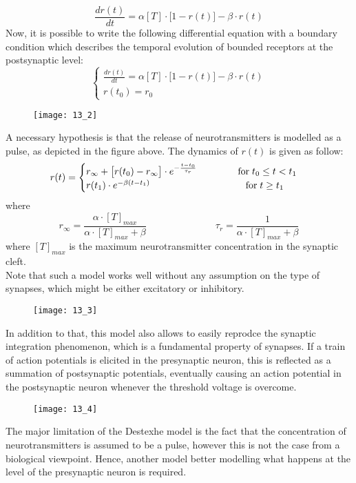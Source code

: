\begin{equation*}
    \frac{dr(t)}{dt}=\alpha[T]\cdot\bigl[1-r(t)\bigr]-\beta\cdot{r(t)}
\end{equation*}
Now, it is possible to write the following differential equation with a boundary
condition which describes the temporal evolution of bounded receptors at the postsynaptic level:
\begin{equation*}
    \begin{cases}
        \frac{dr(t)}{dt}=\alpha[T]\cdot\bigl[1-r(t)\bigr]-\beta\cdot{r(t)} \\
        r(t_{0})=r_{0}
    \end{cases}
\end{equation*}
\begin{figure}[H]
    \texttt{[image: 13\_2]}
    \centering
\end{figure}
A necessary hypothesis is that the release of neurotransmitters is modelled as a pulse,
as depicted in the figure above. The dynamics of \(r(t)\) is given as follow:
\begin{equation*}
    r(t)=
    \begin{cases}
        r_{\infty}+\bigl[r(t_{0})-r_{\infty}\bigr]\cdot{e^{-\frac{t-t_{0}}{\tau_{r}}}}\hspace{1.5cm}\text{for}\;t_{0}\le{t}<t_{1} \\
        r(t_{1})\cdot{e^{-\beta(t-t_{1})}}\hspace{3.5cm}\text{for}\;t\ge{t_{1}}
    \end{cases}
\end{equation*}
where
\begin{equation*}
    r_{\infty}=\frac{\alpha\cdot{[T]_{max}}}{\alpha\cdot{[T]_{max}}+\beta}
    \hspace{3cm}
    \tau_{r}=\frac{1}{\alpha\cdot{[T]_{max}}+\beta}
\end{equation*}
where \([T]_{max}\) is the maximum neurotransmitter concentration in the synaptic cleft.\\
Note that such a model works well without any assumption on the type
of synapses, which might be either excitatory or inhibitory.
\begin{figure}[H]
    \texttt{[image: 13\_3]}
    \centering
\end{figure}
In addition to that, this model also allows to easily reprodce the synaptic
integration phenomenon, which is a fundamental property of synapses. If a train
of action potentials is elicited in the presynaptic neuron, this is reflected
as a summation of postsynaptic potentials, eventually causing an action potential
in the postsynaptic neuron whenever the threshold voltage is overcome.
\begin{figure}[H]
    \texttt{[image: 13\_4]}
    \centering
\end{figure}
The major limitation of the Destexhe model is the fact that the concentration of neurotransmitters is
assumed to be a pulse, however this is not the case from a biological viewpoint. Hence, another
model better modelling what happens at the level of the presynaptic neuron is required.

